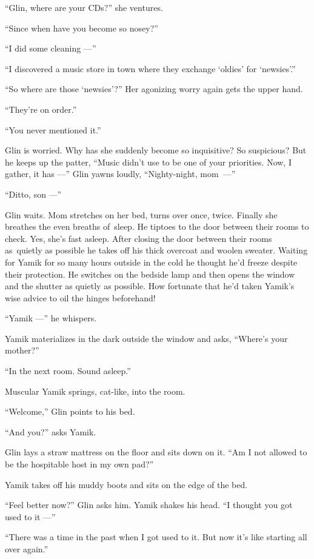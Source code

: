 \documentclass[twoside,11pt,openany]{book}
\begin{document}
``Glin, where are your CDs?''  she ventures.

``Since when have you become so nosey?''

``I did some cleaning ---''

``I discovered a music store in town where they exchange `oldies' for
`newsies'.''

``So where are those `newsies{}'?'' Her agonizing worry again gets the upper hand.

``They're on order.''

``You never mentioned it.''

Glin is worried. Why has she suddenly become so inquisitive? So suspicious? But he keeps up the patter,
``Music didn't use to be one of your priorities. Now, I gather, it has ---'' Glin yawns
loudly{,} ``Nighty-night, mom~---''

``Ditto, son ---''

Glin waits. Mom stretches on her bed, turns over once, twice. Finally she breathes the even breaths of~sleep. He
tiptoes to the door between their rooms to check. Yes, she's fast asleep. After closing the door between their rooms
as~quietly as possible he takes off his thick overcoat and woolen sweater. Waiting for Yamik for so many hours outside
in the cold he thought he'd freeze despite their protection. He switches on the bedside lamp and then opens the window
and the shutter as quietly as possible. How fortunate that he'd
taken Yamik's wise advice to oil the hinges beforehand!

 ``Yamik ---'' he whispers.

Yamik materializes in the dark outside the window and asks, ``Where's your mother?''

``In the next room. Sound asleep.''

Muscular Yamik springs, cat-like, into the room.

``Welcome,'' Glin points to his bed.

``And you?'' asks Yamik.

Glin lays a straw mattress on the floor and sits down on it. ``Am I not allowed to be the hospitable host
in my own pad?''

Yamik takes off his muddy boots and sits on the edge of the bed.

``Feel better now?'' Glin asks him. Yamik shakes his
head.{ }``I thought you got used to it ---''

``There was a time in the past when I got used to it. But now it's like starting all over
again.''
\end{document}
